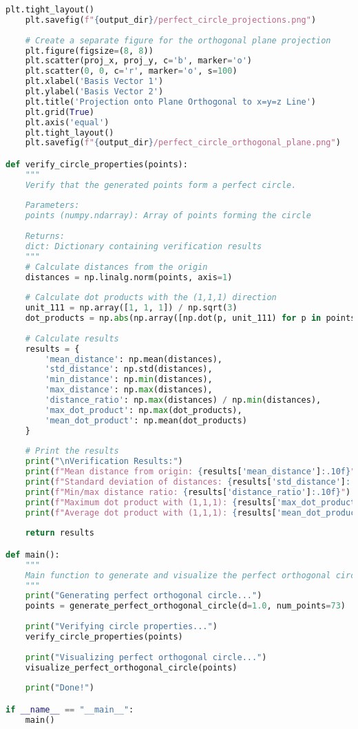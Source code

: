 \begin{lstlisting}[language=Python]
    plt.tight_layout()
    plt.savefig(f"{output_dir}/perfect_circle_projections.png")
    
    # Create a separate figure for the orthogonal plane projection
    plt.figure(figsize=(8, 8))
    plt.scatter(proj_x, proj_y, c='b', marker='o')
    plt.scatter(0, 0, c='r', marker='o', s=100)
    plt.xlabel('Basis Vector 1')
    plt.ylabel('Basis Vector 2')
    plt.title('Projection onto Plane Orthogonal to x=y=z Line')
    plt.grid(True)
    plt.axis('equal')
    plt.tight_layout()
    plt.savefig(f"{output_dir}/perfect_circle_orthogonal_plane.png")

def verify_circle_properties(points):
    """
    Verify that the generated points form a perfect circle.
    
    Parameters:
    points (numpy.ndarray): Array of points forming the circle
    
    Returns:
    dict: Dictionary containing verification results
    """
    # Calculate distances from the origin
    distances = np.linalg.norm(points, axis=1)
    
    # Calculate dot products with the (1,1,1) direction
    unit_111 = np.array([1, 1, 1]) / np.sqrt(3)
    dot_products = np.abs(np.array([np.dot(p, unit_111) for p in points]))
    
    # Calculate results
    results = {
        'mean_distance': np.mean(distances),
        'std_distance': np.std(distances),
        'min_distance': np.min(distances),
        'max_distance': np.max(distances),
        'distance_ratio': np.max(distances) / np.min(distances),
        'max_dot_product': np.max(dot_products),
        'mean_dot_product': np.mean(dot_products)
    }
    
    # Print the results
    print("\nVerification Results:")
    print(f"Mean distance from origin: {results['mean_distance']:.10f}")
    print(f"Standard deviation of distances: {results['std_distance']:.10e}")
    print(f"Min/max distance ratio: {results['distance_ratio']:.10f}")
    print(f"Maximum dot product with (1,1,1): {results['max_dot_product']:.10e}")
    print(f"Average dot product with (1,1,1): {results['mean_dot_product']:.10e}")
    
    return results

def main():
    """
    Main function to generate and visualize the perfect orthogonal circle.
    """
    print("Generating perfect orthogonal circle...")
    points = generate_perfect_orthogonal_circle(d=1.0, num_points=73)
    
    print("Verifying circle properties...")
    verify_circle_properties(points)
    
    print("Visualizing perfect orthogonal circle...")
    visualize_perfect_orthogonal_circle(points)
    
    print("Done!")

if __name__ == "__main__":
    main()
\end{lstlisting}

